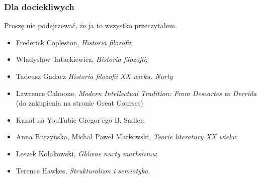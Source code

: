 \documentclass[10pt,t]{beamer}
\begin{document}
\begin{frame}
  \frametitle{Dla dociekliwych}


  Proszę nie podejrzewać, że ja to wszystko przeczytałem.
  \begin{itemize}

  \item Frederick Copleston, \textit{Historia filozofii};

  \item Władysław Tatarkiewicz, \textit{Historia filozofii};

  \item Tadeusz Gadacz \textit{Historia filozofii XX wieku. Nurty}

  \item Lawrence Cahoone, \textit{Modern Intellectual Tradition:
      From Descartes to Derrida} (do zakupienia na stronie Great
    Courses)

  \item Kanał na YouTubie Gregor’ego B. Sadler;

  \item Anna Burzyńska, Michał Paweł Markowski, \textit{Teorie
      literatury XX wieku};

  \item Leszek Kołakowski, \textit{Główne nurty marksizmu};

  \item Terence Hawkes, \textit{Strukturalizm i semiotyka}.

  \end{itemize}

\end{frame}
\end{document}
